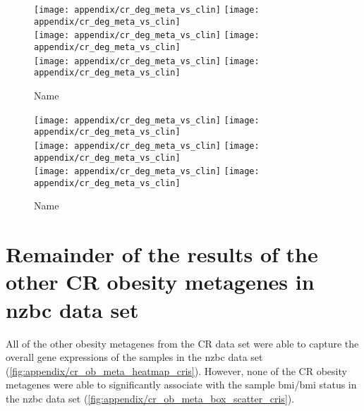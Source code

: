 \begin{appendices}
	\begin{figure}[htpb]
		\ContinuedFloat
		\captionsetup{list=off,format=cont}
		\centering
		\texttt{[image: appendix/cr\_deg\_meta\_vs\_clin]}
		\hfill
		\texttt{[image: appendix/cr\_deg\_meta\_vs\_clin]}\\
		\texttt{[image: appendix/cr\_deg\_meta\_vs\_clin]}
		\hfill
		\texttt{[image: appendix/cr\_deg\_meta\_vs\_clin]}\\
		\texttt{[image: appendix/cr\_deg\_meta\_vs\_clin]}
		\hfill
		\texttt{[image: appendix/cr\_deg\_meta\_vs\_clin]}\\
		\caption{Name}
	\end{figure}

	\begin{figure}[htpb]
		\ContinuedFloat
		\captionsetup{list=off,format=cont}
		\centering
		\texttt{[image: appendix/cr\_deg\_meta\_vs\_clin]}
		\hfill
		\texttt{[image: appendix/cr\_deg\_meta\_vs\_clin]}\\
		\texttt{[image: appendix/cr\_deg\_meta\_vs\_clin]}
		\hfill
		\texttt{[image: appendix/cr\_deg\_meta\_vs\_clin]}\\
		\texttt{[image: appendix/cr\_deg\_meta\_vs\_clin]}
		\hfill
		\texttt{[image: appendix/cr\_deg\_meta\_vs\_clin]}\\
		\caption{Name}
	\end{figure}

	\section{Remainder of the results of the other CR obesity metagenes in \gls{nzbc} data set}
	\label{sec:rest_of_the_cr_ob_meta_heatmap_results_cris}

	All of the other obesity metagenes from the CR data set were able to capture the overall gene expressions of the samples in the \gls{nzbc} data set (\cref{fig:appendix/cr_ob_meta_heatmap_cris}).
	However, none of the CR obesity metagenes were able to significantly associate with the sample \gls{bmi}/\gls{bmi} status in the \gls{nzbc} data set (\cref{fig:appendix/cr_ob_meta_box_scatter_cris}).


\end{appendices}
